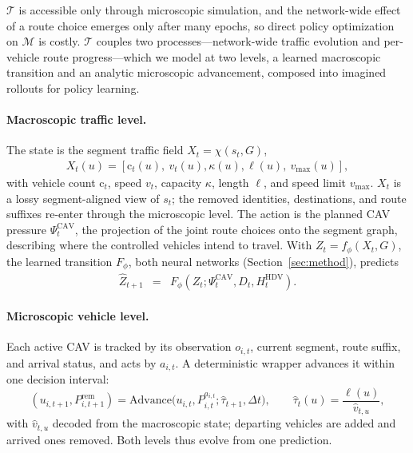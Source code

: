 \(\mathcal{T}\) is accessible only through microscopic simulation, and the
network-wide effect of a route choice emerges only after many epochs, so
direct policy optimization on \(\mathcal{M}\) is costly.  \(\mathcal{T}\)
couples two processes---network-wide traffic evolution and per-vehicle
route progress---which we model at two levels, a learned macroscopic
transition and an analytic microscopic advancement, composed into imagined
rollouts for policy learning.

\paragraph{Macroscopic traffic level.}
The state is the segment traffic field \(X_t=\chi(s_t,G)\),
\begin{equation}
\begin{array}{l}
X_t(u)=
[\mathrm{c}_t(u),\ v_t(u),
\kappa(u),
\ell(u),\ v_{\max}(u)],
\end{array}
\label{eq:traffic-field}
\end{equation}
with vehicle count \(\mathrm{c}_t\), speed \(v_t\), capacity \(\kappa\),
length \(\ell\), and speed limit \(v_{\max}\).  \(X_t\) is a lossy
segment-aligned view of \(s_t\); the removed identities, destinations, and
route suffixes re-enter through the microscopic level.  The action is the
planned CAV pressure \(\Psi_t^{\mathrm{CAV}}\), the projection of the joint
route choices onto the segment graph, describing where the controlled
vehicles intend to travel.  With \(Z_t=f_\phi(X_t,G)\), the learned
transition \(F_\phi\), both neural networks (Section~\ref{sec:method}),
predicts
\begin{equation}
  \begin{array}{rcl}
  \hat Z_{t+1}
  &=&
  F_\phi(
  Z_t; \Psi_t^{\mathrm{CAV}},D_t,H_t^{\mathrm{HDV}}
  ).
  \end{array}
  \label{eq:macro-transition}
\end{equation}

\paragraph{Microscopic vehicle level.}
Each active CAV is tracked by its observation \(o_{i,t}\), current segment,
route suffix, and arrival status, and acts by \(a_{i,t}\).  A deterministic
wrapper advances it within one decision interval:
\begin{equation}
(u_{i,t+1}, P^{\mathrm{rem}}_{i,t+1})
=
\mathrm{Advance}\!\big(u_{i,t}, P^{a_{i,t}}_{i,t};
\widehat\tau_{t+1}, \Delta t\big),
\qquad
\widehat\tau_t(u) = \frac{\ell(u)}{\widehat v_{t,u}},
\label{eq:micro-advance}
\end{equation}
with \(\widehat v_{t,u}\) decoded from the macroscopic state; departing
vehicles are added and arrived ones removed.  Both levels thus evolve from
one prediction.

